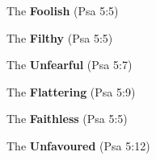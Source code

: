 \begin{compactenum}[I.][8]
    \item The \textbf{Foolish}  (Psa 5:5) 
    \item The \textbf{Filthy}  (Psa 5:5) 
    \item The \textbf{Unfearful}  (Psa 5:7) 
    \item The \textbf{Flattering}  (Psa 5:9) 
    \item The \textbf{Faithless}  (Psa 5:5) 
    \item The \textbf{Unfavoured}  (Psa 5:12) 
\end{compactenum} 

